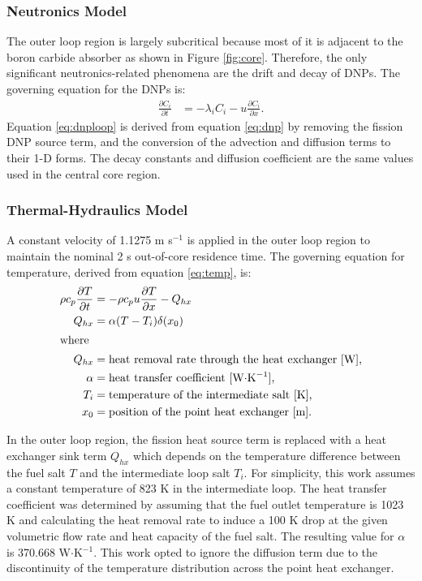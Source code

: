 \subsubsection{Neutronics Model}

The outer loop region is largely subcritical because most of it is adjacent to
the boron carbide absorber as shown in Figure \ref{fig:core}. Therefore, the
only significant neutronics-related phenomena are the drift and decay of
\glspl{DNP}. The governing equation for the \glspl{DNP} is:
%
\begin{align}
    \frac{\partial C_i}{\partial t} &= - \lambda_i C_i - u
    \frac{\partial C_i}{\partial x}.
    \label{eq:dnploop}
\end{align}
%
Equation \ref{eq:dnploop} is derived from equation \ref{eq:dnp} by removing
the fission \gls{DNP} source term, and the conversion of the advection and
diffusion terms to their 1-D forms. The decay constants and diffusion
coefficient are the same values used in the central core region.

\subsubsection{Thermal-Hydraulics Model}

A constant velocity of 1.1275 m s$^{-1}$ is applied in the outer loop region
to maintain the nominal 2 s out-of-core residence time. The governing equation
for temperature, derived from equation \ref{eq:temp}, is:
%
\begin{align}
    \rho c_{p} \frac{\partial T}{\partial t} &= - \rho c_p u
    \frac{\partial T}{\partial x} - Q_{hx} \label{eq:temploop} \\
    Q_{hx} &= \alpha (T - T_i) \delta (x_0) \label{eq:hx} \\
    \intertext{where}
    Q_{hx} &= \text{heat removal rate through the heat exchanger [W],} 
    \nonumber \\
    \alpha &= \text{heat transfer coefficient [W$\cdot$K$^{-1}$],} \nonumber
    \\
    T_i &= \text{temperature of the intermediate salt [K],} \nonumber \\
    x_0 &= \text{position of the point heat exchanger [m].} \nonumber
\end{align}

In the outer loop region, the fission heat source term is replaced with a heat
exchanger sink term $Q_{hx}$
which depends on the temperature difference between the fuel salt $T$ and the
intermediate loop salt $T_i$. For simplicity, this work assumes a constant
temperature of 823 K in the intermediate loop. The heat transfer coefficient
was determined by assuming that the fuel outlet temperature is 1023 K and
calculating the heat removal rate to induce a 100 K drop at the given
volumetric flow rate and heat capacity of the fuel salt. The resulting value
for $\alpha$ is 370.668 W$\cdot$K$^{-1}$. This work opted to
ignore the diffusion term due to the discontinuity of the temperature
distribution across the point heat exchanger. 

